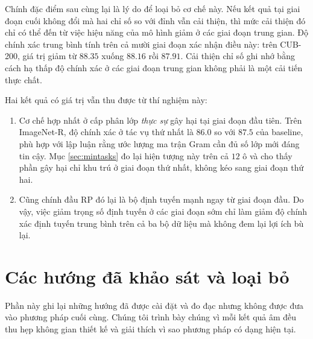 \documentclass[11pt,a4paper]{article}
\begin{document}
Chính đặc điểm sau cùng lại là lý do để loại bỏ cơ chế này. Nếu kết quả tại giai
đoạn cuối không đổi mà hai chỉ số so với đỉnh vẫn cải thiện, thì mức cải thiện
đó chỉ có thể đến từ việc hiệu năng của mô hình giảm ở các giai đoạn trung gian.
Độ chính xác trung bình tính trên cả mười giai đoạn xác nhận điều này: trên
CUB-200, giá trị giảm từ $88.35$ xuống $88.16$ rồi $87.91$. Cải thiện chỉ số ghi
nhớ bằng cách hạ thấp độ chính xác ở các giai đoạn trung gian không phải là một
cải tiến thực chất.

Hai kết quả có giá trị vẫn thu được từ thí nghiệm này:

\begin{enumerate}[leftmargin=*, itemsep=3pt]
\item Cơ chế hợp nhất ở cấp phân lớp \emph{thực sự} gây hại tại giai đoạn đầu
      tiên. Trên ImageNet-R, độ chính xác ở tác vụ thứ nhất là $86.0$ so với
      $87.5$ của baseline, phù hợp với lập luận rằng ước lượng ma trận Gram
      cần đủ số lớp mới đáng tin cậy. Mục \ref{sec:mintasks} đo lại hiện
      tượng này trên cả $12$ ô và cho thấy phần gây hại chỉ khu trú ở giai
      đoạn thứ nhất, không kéo sang giai đoạn thứ hai.
\item Cũng chính đầu RP đó lại là bộ định tuyến mạnh ngay từ giai đoạn đầu. Do
      vậy, việc giảm trọng số định tuyến ở các giai đoạn sớm chỉ làm giảm độ
      chính xác định tuyến trung bình trên cả ba bộ dữ liệu mà không đem lại lợi
      ích bù lại.
\end{enumerate}

\section{Các hướng đã khảo sát và loại bỏ}
\label{sec:closed}

Phần này ghi lại những hướng đã được cài đặt và đo đạc nhưng không được đưa vào
phương pháp cuối cùng. Chúng tôi trình bày chúng vì mỗi kết quả âm đều thu hẹp
không gian thiết kế và giải thích vì sao phương pháp có dạng hiện tại.
\end{document}
